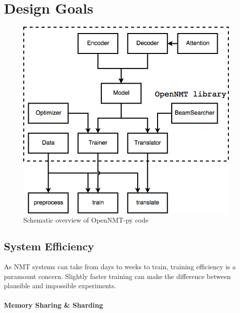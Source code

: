 \documentclass[]{article}
\begin{document}
\section{Design Goals}
\begin{figure}[t]
        \centering
        \includegraphics[scale=0.3]{OpenNMTDiagram.png}
        \caption{\label{fig:codestruct}Schematic overview of OpenNMT-py code}
       \vspace{-0.3cm}
    \end{figure}
    
\subsection{System Efficiency}

As NMT systems can take from days to weeks to train, training
efficiency is a paramount concern. Slightly faster training can make the difference between
plausible and impossible experiments.

\paragraph{Memory Sharing \& Sharding}
\end{document}
